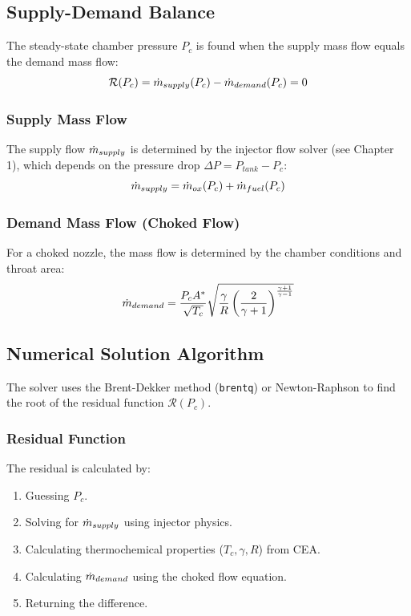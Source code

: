 \subsection{Supply-Demand Balance}
The steady-state chamber pressure $P_c$ is found when the supply mass flow equals the demand mass flow:
\begin{equation}
\mathcal{R}(P_c) = \dot{m}_{supply}(P_c) - \dot{m}_{demand}(P_c) = 0
\end{equation}

\subsubsection{Supply Mass Flow}
The supply flow $\dot{m}_{supply}$ is determined by the injector flow solver (see Chapter 1), which depends on the pressure drop $\Delta P = P_{tank} - P_c$:
\begin{equation}
\dot{m}_{supply} = \dot{m}_{ox}(P_c) + \dot{m}_{fuel}(P_c)
\end{equation}

\subsubsection{Demand Mass Flow (Choked Flow)}
For a choked nozzle, the mass flow is determined by the chamber conditions and throat area:
\begin{equation}
\dot{m}_{demand} = \frac{P_c A^*}{\sqrt{T_c}} \sqrt{\frac{\gamma}{R} \left(\frac{2}{\gamma+1}\right)^{\frac{\gamma+1}{\gamma-1}}}
\end{equation}

\subsection{Numerical Solution Algorithm}
The solver uses the Brent-Dekker method (\texttt{brentq}) or Newton-Raphson to find the root of the residual function $\mathcal{R}(P_c)$.

\subsubsection{Residual Function}
The residual is calculated by:
\begin{enumerate}
    \item Guessing $P_c$.
    \item Solving for $\dot{m}_{supply}$ using injector physics.
    \item Calculating thermochemical properties ($T_c, \gamma, R$) from CEA.
    \item Calculating $\dot{m}_{demand}$ using the choked flow equation.
    \item Returning the difference.
\end{enumerate}

